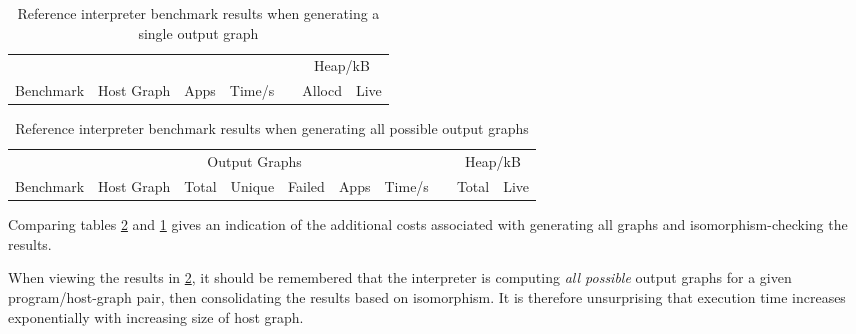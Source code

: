 \begin{table}[h]
\begin{minipage}{\textwidth}
\centering

\begin{tabular}{llrrcrr}
\hline 
&  & & & & \multicolumn{2}{c}{Heap/kB}\\
Benchmark          & Host Graph & Apps & Time/s   & & Allocd & Live \\
\hline 

\end{tabular}

\caption[Reference interpreter benchmarks]{Reference interpreter benchmark results when generating a single output graph}

\label{table:resultsSingle}
\end{minipage}
\end{table}



\begin{table}[h]
\begin{minipage}{\textwidth}
\centering

\begin{tabular}{llrrrrrcrr}
\hline 
&  & \multicolumn{3}{c}{Output Graphs} & & && \multicolumn{2}{c}{Heap/kB}\\
Benchmark          & Host Graph & Total & Unique   & Failed & Apps & Time/s   & & Total  & Live \\
\hline 

\end{tabular}

\caption[Reference interpreter benchmarks]{Reference interpreter benchmark results when generating all possible output graphs}

\label{table:resultsAll}
\end{minipage}
\end{table}


Comparing tables \ref{table:resultsAll} and \ref{table:resultsSingle} gives an indication of the additional costs associated with generating all graphs and isomorphism-checking the results.




When viewing the results in \ref{table:resultsAll}, it should be remembered that the interpreter is computing \textit{all possible} output graphs for a given program/host-graph pair, then consolidating the results based on isomorphism. It is therefore unsurprising that execution time increases exponentially with increasing size of host graph.

